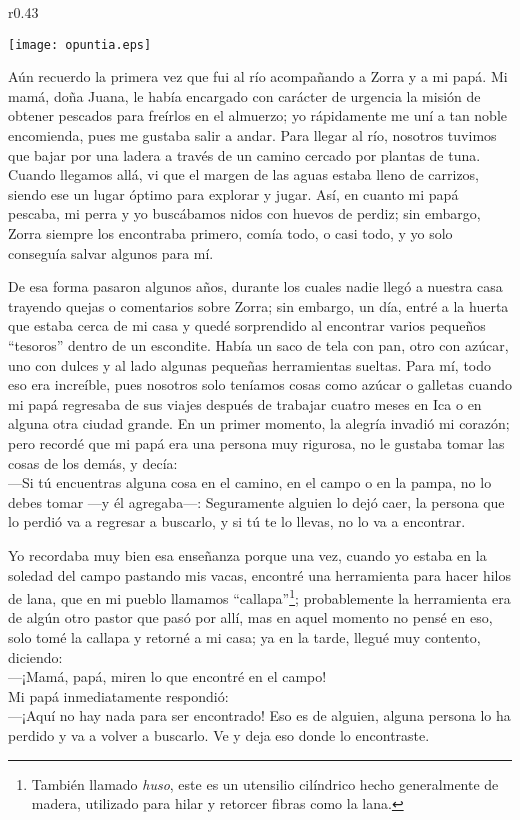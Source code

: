 \ifdefined\EnableIncludeImages
\begin{wrapfigure}{r}{0.43\textwidth}
  \begin{center}
  \vspace{-30pt}
    \texttt{[image: opuntia.eps]}
  \end{center}
  \vspace{-20pt}
\end{wrapfigure}
\fi
Aún recuerdo la primera vez que fui al río acompañando a Zorra y a mi papá. 
Mi mamá, doña Juana, le había encargado con carácter de urgencia la misión de obtener pescados para freírlos en el almuerzo; 
yo rápidamente me uní a tan noble encomienda, pues me gustaba salir a andar.
Para llegar al río, nosotros tuvimos que bajar por una ladera a través de un camino cercado por plantas de tuna. 
Cuando llegamos allá, vi que el margen de las aguas estaba lleno de carrizos, siendo ese un lugar óptimo para explorar y jugar. 
Así, en cuanto mi papá pescaba, mi perra y yo buscábamos nidos con huevos de perdiz; 
sin embargo, Zorra siempre los encontraba primero, comía todo, o casi todo, y yo solo conseguía salvar algunos para mí. 

De esa forma pasaron algunos años, durante los cuales nadie llegó a nuestra casa trayendo quejas o comentarios sobre Zorra; 
sin embargo, un día, entré a la huerta que estaba cerca de mi casa y quedé sorprendido al encontrar varios pequeños ``tesoros'' dentro de un escondite. 
Había un saco de tela con pan, otro con azúcar, uno con dulces y al lado algunas pequeñas herramientas sueltas.
Para mí, todo eso era increíble, pues nosotros solo teníamos cosas como azúcar o galletas cuando mi papá regresaba de sus viajes después de trabajar cuatro meses en Ica o en alguna otra ciudad grande. 
En un primer momento, la alegría invadió mi corazón; pero recordé que mi papá era una persona muy rigurosa, no le gustaba tomar las cosas de los demás, y decía: \\\indent
---Si tú encuentras alguna cosa en el camino, en el campo o en la pampa, no lo debes tomar ---y él agregaba---: 
Seguramente alguien lo dejó caer, la persona que lo perdió va a regresar a buscarlo, y si tú te lo llevas, no lo va a encontrar.

Yo recordaba muy bien esa enseñanza porque una vez, cuando yo estaba en la soledad del campo pastando mis vacas, encontré una herramienta para hacer hilos de lana, que en mi pueblo llamamos ``callapa''\footnote{También llamado \textit{huso}, este es un utensilio cilíndrico hecho generalmente de madera, utilizado para hilar y retorcer fibras como la lana.}; probablemente la herramienta era de algún otro pastor que pasó por allí, mas en aquel momento no pensé en eso, solo tomé la callapa y retorné a mi casa; ya en la tarde, llegué muy contento, diciendo:\\\indent
---¡Mamá, papá, miren lo que encontré en el campo!\\\indent
Mi papá inmediatamente respondió:\\\indent
---¡Aquí no hay nada para ser encontrado! Eso es de alguien, alguna persona lo ha perdido y va a volver a buscarlo. 
Ve y deja eso donde lo encontraste.

